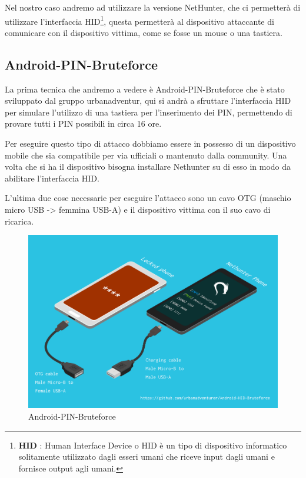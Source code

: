 \newpage

Nel nostro caso andremo ad utilizzare la versione NetHunter, che ci permetterà di utilizzare l'interfaccia HID\footnote[1]{\textbf{HID} : Human Interface Device o HID è un tipo di dispositivo informatico solitamente utilizzato dagli esseri umani che riceve input dagli umani e fornisce output agli umani.}, questa permetterà al dispositivo attaccante di comunicare con il dispositivo vittima, come se fosse un mouse o una tastiera.

\subsection{Android-PIN-Bruteforce}

La prima tecnica che andremo a vedere è Android-PIN-Bruteforce\cite{Android-PIN-Bruteforce} che è stato sviluppato dal gruppo urbanadventur, qui si andrà a sfruttare l’interfaccia HID per simulare l’utilizzo di una tastiera per l’inserimento dei PIN, permettendo di provare tutti i PIN possibili in circa 16 ore.

Per eseguire questo tipo di attacco dobbiamo essere in possesso di un dispositivo mobile che sia compatibile per via ufficiali\cite{nethunter_official} o mantenuto dalla community\cite{nethunter_community}. Una volta che si ha il dispositivo bisogna installare Nethunter su di esso in modo da abilitare l'interfaccia HID.

L'ultima due cose necessarie per eseguire l'attacco sono un cavo OTG (maschio micro USB  -> femmina USB-A) e il dispositivo vittima con il suo cavo di ricarica.

\begin{figure}[h!]
    \centering
    \includegraphics[width=140mm]{Immagini/3/pin_brute_1.png}
    \caption{Android-PIN-Bruteforce}
    \label{fig:Android-PIN-Bruteforce}
\end{figure}

